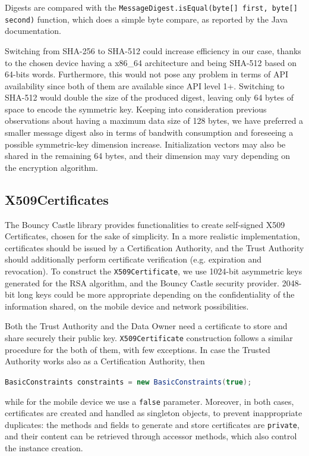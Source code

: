 Digests are compared with the \texttt{MessageDigest.isEqual(byte[] first, byte[] second)} function, which does a simple byte compare, as reported by the Java documentation.

Switching from SHA-256 to SHA-512 could increase efficiency in our case, thanks to the chosen device having a x86\_64 architecture and being SHA-512 based on 64-bits words.  Furthermore, this would not pose any problem in terms of API availability since both of them are available since API level 1+. Switching to SHA-512 would double the size of the produced digest, leaving only 64 bytes of space to encode the symmetric key. Keeping into consideration previous observations about having a maximum data size of 128 bytes, we have preferred a smaller message digest also in terms of bandwith consumption and foreseeing a possible symmetric-key dimension increase. Initialization vectors may also be shared in the remaining 64 bytes, and their dimension may vary depending on the encryption algorithm.

\subsection{X509Certificates}
\label{subsec:x509cert}
The Bouncy Castle library provides functionalities to create self-signed X509 Certificates, chosen for the sake of simplicity. In a more realistic implementation, certificates should be issued by a Certification Authority, and the Trust Authority should additionally perform certificate verification (e.g. expiration and revocation). To construct the \texttt{X509Certificate}, we use 1024-bit asymmetric keys generated for the RSA algorithm, and the Bouncy Castle security provider. 2048-bit long keys could be more appropriate depending on the confidentiality of the information shared, on the mobile device and network possibilities.

Both the Trust Authority and the Data Owner need a certificate to store and share securely their public key. \texttt{X509Certificate} construction follows a similar procedure for the both of them, with few exceptions. In case the Trusted Authority works also as a Certification Authority, then 

\lstinline[language=java]!BasicConstraints constraints = new BasicConstraints(true);!

\noindent while for the mobile device we use a \texttt{false} parameter. Moreover, in both cases, certificates are created and handled as singleton objects, to prevent inappropriate duplicates: the methods and fields to generate and store certificates are \texttt{private}, and their content can be retrieved through accessor methods, which also control the instance creation.

